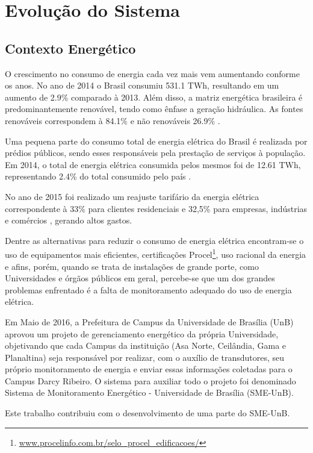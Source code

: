 \chapter{Evolução do Sistema}

\section{Contexto Energético}
O crescimento no consumo de energia cada vez mais vem aumentando conforme os anos. No
ano de 2014 o Brasil consumiu 531.1 TWh, resultando em um aumento de 2.9\% comparado à 2013. Além disso, a matriz energética brasileira é predominantemente renovável, tendo como ênfase a geração hidráulica. As fontes renováveis correspondem à 84.1\% e não renováveis 26.9\% \cite{balanco_energetico}.

Uma pequena parte do consumo total de energia elétrica do Brasil é realizada por prédios públicos, sendo
esses responsáveis pela prestação de serviços à população. Em 2014, o total de energia elétrica consumida
pelos mesmos foi de 12.61 TWh, representando 2.4\% do total consumido pelo país \cite{balanco_energetico}.

No ano de 2015 foi realizado um reajuste tarifário da energia elétrica correspondente à 33\% para clientes residenciais e 32,5\% para empresas, indústrias e comércios \cite{aumento_energia}, gerando altos gastos.

Dentre as alternativas para reduzir o consumo de energia elétrica encontram-se o uso de equipamentos mais eficientes, certificações Procel\footnote{\url{www.procelinfo.com.br/selo_procel_edificacoes/}}, uso racional da energia e afins, porém, quando se trata de instalações de grande porte, como Universidades e órgãos públicos em geral, percebe-se que um dos grandes problemas enfrentado é a falta de monitoramento adequado do uso de energia elétrica.

Em Maio de 2016, a Prefeitura de Campus da Universidade de Brasília (UnB) aprovou um projeto de gerenciamento energético da própria Universidade, objetivando que cada Campus da instituição (Asa Norte, Ceilândia, Gama e Planaltina) seja responsável por realizar, com o auxílio de transdutores, seu próprio monitoramento de energia e enviar essas informações coletadas para o Campus Darcy Ribeiro. O sistema para auxiliar todo o projeto foi denominado Sistema de Monitoramento Energético - Universidade de Brasília (SME-UnB).

Este trabalho contribuiu com o desenvolvimento de uma parte do SME-UnB.

